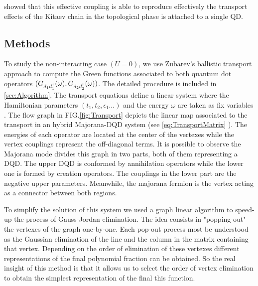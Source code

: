 \documentclass[showpacs,aps,prb,reprint,superscriptaddress]{revtex4-1}
\newcommand{\Jesus}[1]{\textcolor{red}{\fbox{Jesus} {\sl#1}}}
\begin{document}
\citeauthor{ruiz-tijerina_interaction_2015}  showed that this effective coupling  is able to reproduce effectively the transport effects of  the Kitaev chain in the topological phase is attached to a single QD.  \\








 
\subsection{Methods}



To study the non-interacting case $(U=0)$, we use Zubarev's ballistic transport approach \cite{zubarev_double-time_1960} to compute the Green functions associated to both quantum dot operators $(G_{d_1d^\dagger_1}(\omega),G_{d_2d^\dagger_2}(\omega))$. The detailed procedure is included in \ref{sec:Algorithm}. The transport equations define a linear system where the Hamiltonian parameters $(t_1,t_2,\epsilon_1 \ldots)$ and the energy $\omega$ are taken as fix variables . The flow graph in FIG.\ref{fig:Transport} depicts the linear map associated to the transport in an hybrid Majorana-DQD system (see \eqref{eq:TransportMatrix} ). The energies of each operator are located at the center of the vertexes while the vertex couplings represent the off-diagonal terms. It is possible to observe the Majorana mode divides this graph in  two parts, both of them representing a DQD. The upper DQD is conformed by annihilation operators while the lower one is formed by creation operators. The couplings in the lower part are the negative upper parameters. Meanwhile, the majorana fermion is the vertex acting as a  connector between both regions.

To simplify the solution of this system we used a graph linear algorithm \cite{spielman_algorithms_2010} to speed-up the process of Gauss-Jordan elimination. The idea consists in "popping-out" the vertexes of the graph one-by-one. Each pop-out process most be understood as the Gaussian elimination of the line and the column in the matrix containing that vertex. Depending on the order of elimination of these vertexes different representations of the final polynomial fraction can be obtained. So the real insight of this method is that it allows us to select the order of vertex elimination to obtain the simplest representation of the final this function.
\end{document}
